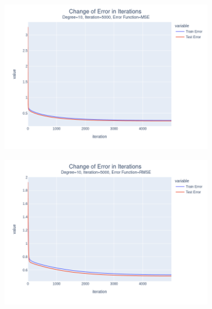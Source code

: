 \documentclass[14pt,a4]{article}
\begin{document}
\begin{figure}[h]
\begin{subfigure}{0.3\textwidth}
        \includegraphics[width=\textwidth]{images/implementation/q1/part_d/error/10_5000_MSE.png}
    \end{subfigure}
    \hfill
    \begin{subfigure}{0.3\linewidth}
        \centering
        \includegraphics[width=\textwidth]{images/implementation/q1/part_d/error/10_5000_RMSE.png}
    \end{subfigure}
    \newline
    \begin{subfigure}{0.3\linewidth}
        \centering

\end{subfigure}
\end{figure}
\end{document}
